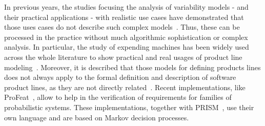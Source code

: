 In previous years, the studies focusing the analysis of variability models  - and
their practical applications - with realistic use cases
have demonstrated that those uses cases do not describe such complex models~\cite{jhf11, jhfes12}. Thus, these
can be processed in the practice without much algorithmic sophistication or
complex analysis.
In particular, the study of expending machines
has been widely used across the whole
literature to show practical and real usages of product
line modeling~\cite{jhfes12}. Moreover, it is described that those models for defining products
lines does not always apply to the
formal definition and description of software
product lines, as they are not directly related~\cite{cds06, fub06, nnz14}.
Recent implementations, like ProFeat~\cite{Chrszon2018}, allow to
help in the verification of requirements for families of probabilistic systems. These implementations,
together with PRISM~\cite{mgd12}, use their own language and are based on Markov decision processes.














